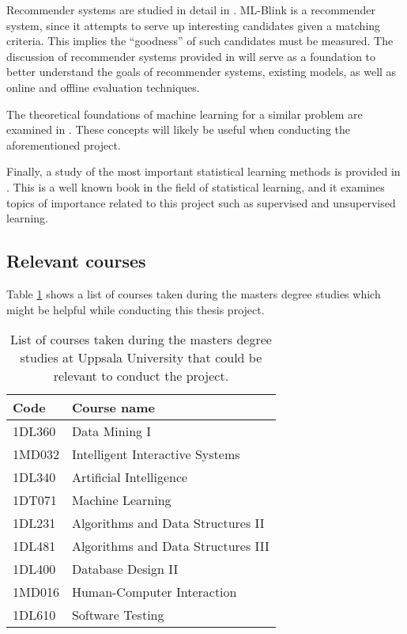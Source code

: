 Recommender systems are studied in detail in \cite{BOOK:RST}. ML-Blink is a recommender system, since it attempts to serve up interesting candidates given a matching criteria. This implies the ``goodness'' of such candidates must be measured. The discussion of recommender systems provided in \cite{BOOK:RST} will serve as a foundation to better understand the goals of recommender systems, existing models, as well as online and offline evaluation techniques.

The theoretical foundations of machine learning for a similar problem are examined in \cite{article:fastlund}. These concepts will likely be useful when conducting the aforementioned project.

Finally, a study of the most important statistical learning methods is provided in \cite{BOOK:ESL}. This is a well known book in the field of statistical learning, and it examines topics of importance related to this project such as supervised and unsupervised learning.

\subsection{Relevant courses}
Table \ref{approach:relevant_courses} shows a list of courses taken during the masters degree studies which might be helpful while conducting this thesis project.

\begin{table}[ht]
  \centering
  \begin{tabularx}{\textwidth}{|l|X|}
    \hline
    Code & Course name \\
    \hline
    1DL360 & Data Mining I \\
    1MD032 & Intelligent Interactive Systems \\
    1DL340 & Artificial Intelligence \\
    1DT071 & Machine Learning \\
    1DL231 & Algorithms and Data Structures II \\
    1DL481 & Algorithms and Data Structures III \\
    1DL400 & Database Design II \\
    1MD016 & Human-Computer Interaction \\
    1DL610 & Software Testing \\
    \hline
  \end{tabularx}
  \caption{List of courses taken during the masters degree studies at Uppsala University that could be relevant to conduct the project.}
  \label{approach:relevant_courses}
\end{table}